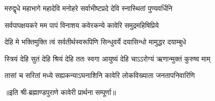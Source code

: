 

\twolineshloka
{मरुद्वृधे महाभागे महादेवि मनोहरे}
{सर्वाभीष्टप्रदे देवि स्नास्थितां पुण्यवर्धिनि}%

\twolineshloka
{सर्वपापक्षयकरे मम पापं विनाशय}
{कवेरकन्ये कावेरि समुद्रमहिषिप्रिये}%

\twolineshloka
{देहि मे भक्तिमुक्ति त्वं सर्वतीर्थस्वरूपिणि}
{सिन्धुवर्ये दयासिन्धो मामुद्धर दयाम्बुधे}%

\twolineshloka
{स्त्रियं देहि सुतं देहि श्रियं देहि ततः स्वगा}
{आयुष्यं देहि चाऽऽरोग्यं ऋणान्मुक्तं कुरुष्व माम्}%

\twolineshloka
{तासां च सरितां मध्ये सह्यकन्याऽघनाशिनि}
{कावेरि लोकविख्याता जनतापनिवारिणि}%

॥इति श्री-ब्रह्माण्डपुराणे कावेरी प्रार्थना सम्पूर्णा॥